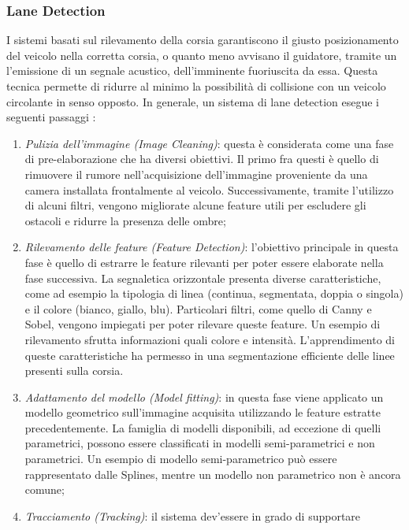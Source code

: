 \subsubsection{Lane Detection}
I sistemi basati sul rilevamento della corsia garantiscono il giusto posizionamento 
del veicolo nella corretta corsia, o quanto meno avvisano il guidatore, 
tramite un l'emissione di un segnale acustico, dell'imminente fuoriuscita 
da essa. Questa tecnica permette di ridurre al minimo la possibilità di 
collisione con un veicolo circolante in senso opposto. In generale, un sistema 
di lane detection esegue i seguenti passaggi \cite{lane-steps}:
\begin{enumerate}
    \item \emph{Pulizia dell'immagine (Image Cleaning)}: questa è considerata come 
    una fase di pre-elaborazione che ha diversi obiettivi. Il primo fra 
    questi è quello di rimuovere il rumore nell'acquisizione dell'immagine 
    proveniente da una camera installata frontalmente al veicolo. Successivamente, 
    tramite l'utilizzo di alcuni filtri, vengono migliorate alcune 
    feature utili per escludere gli ostacoli e ridurre la presenza delle ombre;
    \item \emph{Rilevamento delle feature (Feature Detection)}: l'obiettivo principale 
    in questa fase è quello di estrarre le feature rilevanti per poter essere 
    elaborate nella fase successiva. La segnaletica orizzontale presenta 
    diverse caratteristiche, come ad esempio la tipologia di linea (continua, 
    segmentata, doppia o singola) e il colore (bianco, giallo, blu). Particolari 
    filtri, come quello di Canny e Sobel, vengono impiegati per poter 
    rilevare queste feature. Un esempio di rilevamento sfrutta informazioni 
    quali colore e intensità. L'apprendimento di queste caratteristiche ha 
    permesso in \cite{lane-detection} una segmentazione efficiente delle linee presenti sulla 
    corsia.
    \item \emph{Adattamento del modello (Model fitting)}: in questa fase viene applicato 
    un modello geometrico sull'immagine acquisita utilizzando le 
    feature estratte precedentemente. La famiglia di modelli disponibili, 
    ad eccezione di quelli parametrici, possono essere classificati in 
    modelli semi-parametrici e non parametrici. Un esempio di modello 
    semi-parametrico può essere rappresentato dalle Splines, mentre un 
    modello non parametrico non è ancora comune;
    \item \emph{Tracciamento (Tracking)}: il sistema dev'essere in grado di supportare 

\end{enumerate}

